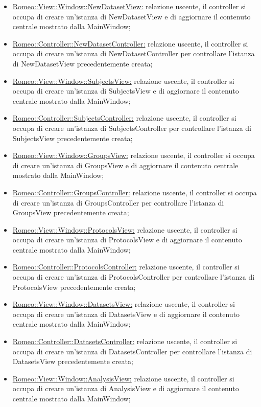\begin{itemize}
				\item \hyperref[ndv]{Romeo::View::Window::NewDatasetView:} relazione uscente, il controller si occupa di creare un'istanza di NewDatasetView e di aggiornare il contenuto centrale mostrato dalla MainWindow;
				\item \hyperref[controller_nd]{Romeo::Controller::NewDatasetController:} relazione uscente, il controller si occupa di creare un'istanza di NewDatasetController per controllare l'istanza di NewDatasetView precedentemente creata;
				\item \hyperref[vsv]{Romeo::View::Window::SubjectsView:} relazione uscente, il controller si occupa di creare un'istanza di SubjectsView e di aggiornare il contenuto centrale mostrato dalla MainWindow;
				\item \hyperref[controller_ss]{Romeo::Controller::SubjectsController:} relazione uscente, il controller si occupa di creare un'istanza di SubjectsController per controllare l'istanza di SubjectsView precedentemente creata;
				\item \hyperref[vgv]{Romeo::View::Window::GroupsView:} relazione uscente, il controller si occupa di creare un'istanza di GroupsView e di aggiornare il contenuto centrale mostrato dalla MainWindow;
				\item \hyperref[controller_sg]{Romeo::Controller::GroupsController:} relazione uscente, il controller si occupa di creare un'istanza di GroupsController per controllare l'istanza di GroupsView precedentemente creata;
				\item \hyperref[vpv]{Romeo::View::Window::ProtocolsView:} relazione uscente, il controller si occupa di creare un'istanza di ProtocolsView e di aggiornare il contenuto centrale mostrato dalla MainWindow;
				\item \hyperref[controller_sp]{Romeo::Controller::ProtocolsController:} relazione uscente, il controller si occupa di creare un'istanza di ProtocolsController per controllare l'istanza di ProtocolsView precedentemente creata;
				\item \hyperref[vdv]{Romeo::View::Window::DatasetsView:} relazione uscente, il controller si occupa di creare un'istanza di DatasetsView e di aggiornare il contenuto centrale mostrato dalla MainWindow;
				\item \hyperref[controller_sd]{Romeo::Controller::DatasetsController:} relazione uscente, il controller si occupa di creare un'istanza di DatasetsController per controllare l'istanza di DatasetsView precedentemente creata;
				\item \hyperref[sav]{Romeo::View::Window::AnalysisView:} relazione uscente, il controller si occupa di creare un'istanza di AnalysisView e di aggiornare il contenuto centrale mostrato dalla MainWindow;

\end{itemize}
